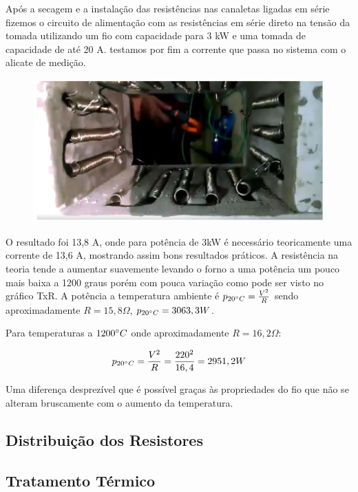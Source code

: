 Após a secagem e a instalação das resistências nas canaletas ligadas em série fizemos o circuito de alimentação com as resistências em série direto na tensão da tomada utilizando um fio com capacidade para 3 kW e uma tomada de capacidade de até 20 A. testamos por fim a corrente que passa no sistema com o alicate de medição.
\begin{figure}[!ht]
	\centering
	\label{foto8}
	\includegraphics[keepaspectratio=true,scale=1.0]{figuras/alimentacao13.JPG}
\end{figure}

O resultado foi 13,8 A, onde para potência de 3kW é necessário teoricamente uma corrente de 13,6 A, mostrando assim bons resultados práticos. A resistência na teoria tende a aumentar suavemente levando o forno a uma potência um pouco mais baixa a 1200 graus porém com pouca variação como pode ser visto no gráfico TxR. A potência a temperatura ambiente é $p_{20 \degree C} = \frac{V^{2}}{R}$ sendo aproximadamente $R = 15,8 \Omega$, $p_{20 \degree C} = 3063,3W$.

Para temperaturas a $1200\degree C$ onde aproximadamente $R = 16,2\Omega$:

\begin{gather}
    p_{20 \degree C} = \frac{V^{2}}{R} = \frac{220^{2}}{16,4} = 2951,2W
\end{gather}

Uma diferença desprezível que é possível graças às propriedades do fio que não se alteram bruscamente com o aumento da temperatura.

\subsection{Distribuição dos Resistores}


\subsection{Tratamento Térmico}

